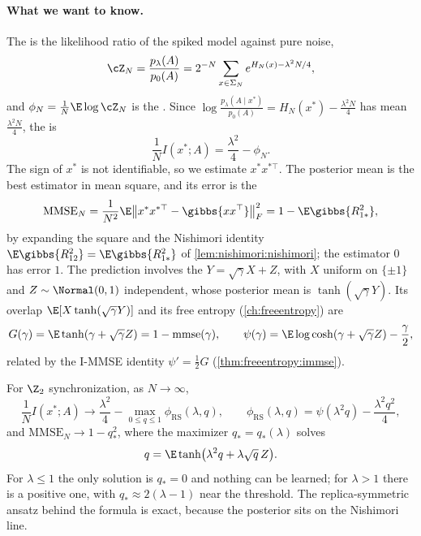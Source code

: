 \begin{refsection}
\paragraph{What we want to know.} The  is the likelihood ratio of the spiked model against pure noise,
\[
\cZ_N=\frac{p_\lambda(A)}{p_0(A)}=2^{-N}\sum_{x\in\Sigma_N}e^{H_N(x)-\lambda^2N/4},
\]
and $\phi_N=\frac1N\E\log\cZ_N$ is the . Since $\log\frac{p_\lambda(A\mid x^*)}{p_0(A)}=H_N(x^*)-\frac{\lambda^2N}4$ has mean $\frac{\lambda^2N}4$, the  is
\begin{equation}\label{eq:nishimori:mi}
\frac1NI(x^*;A)=\frac{\lambda^2}4-\phi_N.
\end{equation}
The sign of $x^*$ is not identifiable, so we estimate $x^*x^{*\top}$. The posterior mean is the best estimator in mean square, and its error is the 
\begin{equation}\label{eq:nishimori:mmse}
\mathrm{MMSE}_N=\frac1{N^2}\E\bigl\|x^*x^{*\top}-\gibbs{xx^\top}\bigr\|_F^2=1-\E\gibbs{R_{1*}^2},
\end{equation}
by expanding the square and the Nishimori identity $\E\gibbs{R_{12}^2}=\E\gibbs{R_{1*}^2}$ of \cref{lem:nishimori:nishimori}; the estimator $0$ has error $1$. The prediction involves the  $Y=\sqrt\gamma X+Z$, with $X$ uniform on $\{\pm1\}$ and $Z\sim\Normal(0,1)$ independent, whose posterior mean is $\tanh(\sqrt\gamma Y)$. Its overlap $\E[X\tanh(\sqrt\gamma Y)]$ and its free entropy (\cref{ch:freeentropy}) are
\begin{equation}\label{eq:nishimori:scalar}
G(\gamma)=\E\tanh(\gamma+\sqrt\gamma Z)=1-\mathrm{mmse}(\gamma),\qquad\psi(\gamma)=\E\log\cosh(\gamma+\sqrt\gamma Z)-\frac\gamma2,
\end{equation}
related by the I-MMSE identity $\psi'=\frac12G$ (\cref{thm:freeentropy:immse}).

\begin{physicsbox}
For $\Z_2$ synchronization, as $N\to\infty$,
\begin{equation}\label{eq:nishimori:prediction}
\frac1NI(x^*;A)\to\frac{\lambda^2}4-\max_{0\le q\le1}\phi_{\mathrm{RS}}(\lambda,q),\qquad\phi_{\mathrm{RS}}(\lambda,q)=\psi(\lambda^2q)-\frac{\lambda^2q^2}4,
\end{equation}
and $\mathrm{MMSE}_N\to1-q_*^2$, where the maximizer $q_*=q_*(\lambda)$ solves
\begin{equation}\label{eq:nishimori:fixedpoint}
q=\E\tanh\bigl(\lambda^2q+\lambda\sqrt q\,Z\bigr).
\end{equation}
For $\lambda\le1$ the only solution is $q_*=0$ and nothing can be learned; for $\lambda>1$ there is a positive one, with $q_*\approx2(\lambda-1)$ near the threshold. The replica-symmetric ansatz behind the formula is exact, because the posterior sits on the Nishimori line.
\end{physicsbox}


\end{refsection}
